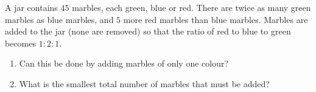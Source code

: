 A jar contains $45$ marbles, each green, blue or red. There are twice as many green marbles as blue marbles, and $5$ more red marbles than blue marbles. Marbles are added to the jar (none are removed) so that the ratio of red to blue to green becomes $1:2:1$.
\begin{enumerate}
\item[(a)] Can this be done by adding marbles of only one colour?
\item[(b)] What is the smallest total number of marbles that must be added?
\end{enumerate}

